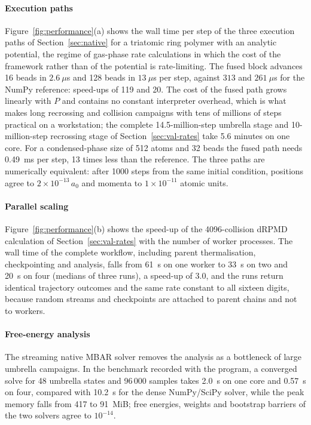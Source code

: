 \documentclass[preprint,12pt]{elsarticle}
\begin{document}
\paragraph{Execution paths} Figure~\ref{fig:performance}(a) shows the wall time per step of the three execution paths of Section~\ref{sec:native} for a triatomic ring polymer with an analytic potential, the regime of gas-phase rate calculations in which the cost of the framework rather than of the potential is rate-limiting. The fused block advances 16 beads in $2.6~\mu$s and 128 beads in $13~\mu$s per step, against $313$ and $261~\mu$s for the NumPy reference: speed-ups of 119 and 20. The cost of the fused path grows linearly with $P$ and contains no constant interpreter overhead, which is what makes long recrossing and collision campaigns with tens of millions of steps practical on a workstation; the complete 14.5-million-step umbrella stage and 10-million-step recrossing stage of Section~\ref{sec:val-rates} take 5.6 minutes on one core. For a condensed-phase size of 512 atoms and 32 beads the fused path needs 0.49~ms per step, 13 times less than the reference. The three paths are numerically equivalent: after 1000 steps from the same initial condition, positions agree to $2\times10^{-13}\,a_0$ and momenta to $1\times10^{-11}$ atomic units.

\paragraph{Parallel scaling} Figure~\ref{fig:performance}(b) shows the speed-up of the 4096-collision dRPMD calculation of Section~\ref{sec:val-rates} with the number of worker processes. The wall time of the complete workflow, including parent thermalisation, checkpointing and analysis, falls from 61~s on one worker to 33~s on two and 20~s on four (medians of three runs), a speed-up of 3.0, and the runs return identical trajectory outcomes and the same rate constant to all sixteen digits, because random streams and checkpoints are attached to parent chains and not to workers.

\paragraph{Free-energy analysis} The streaming native MBAR solver removes the analysis as a bottleneck of large umbrella campaigns. In the benchmark recorded with the program, a converged solve for 48 umbrella states and 96\,000 samples takes 2.0~s on one core and 0.57~s on four, compared with 10.2~s for the dense NumPy/SciPy solver, while the peak memory falls from 417 to 91~MiB; free energies, weights and bootstrap barriers of the two solvers agree to $10^{-14}$.
\end{document}
